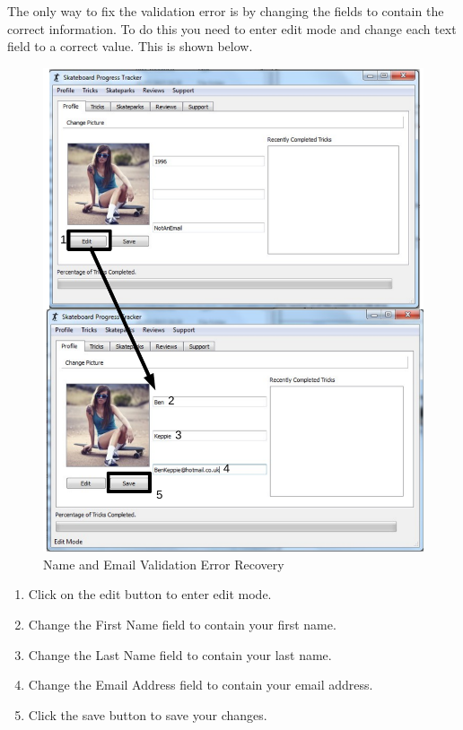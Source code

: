 The only way to fix the validation error is by changing the fields to contain the correct information. To do this you need to enter edit mode and change each text field to a correct value. This is shown below.

\begin{figure}[H]
    \includegraphics[width=\textwidth]{./Manual/Images/FieldValidation2.pdf}
    \caption{Name and Email Validation Error Recovery} \label{fig:ValidationErrorRecovery}
\end{figure}

\begin{enumerate}
\item Click on the edit button to enter edit mode.
\item Change the First Name field to contain your first name.
\item Change the Last Name field to contain your last name.
\item Change the Email Address field to contain your email address.
\item Click the save button to save your changes.
\end{enumerate}


